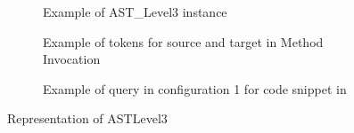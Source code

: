 \begin{figure}[t]
    \centering
      \begin{subfigure}{0.33\textwidth}
        \caption{Example of AST\_Level3 instance}
        \label{fig:mapping_expression} 
      \end{subfigure}
      \hfill
      \begin{subfigure}[t]{0.3\textwidth}
        \caption{Example of tokens for source and target in Method Invocation}
        \label{fig:method_desc_example}
      \end{subfigure}
      \begin{subfigure}{0.35\textwidth}
        \caption{\label{fig:example_in} Example of query in configuration 1 for code snippet in \cite{id:IntrinsicAndroidExample}}
      \end{subfigure}
\caption{
\label{fig:CombineImageOfASTLevel3}%
Representation of ASTLevel3}
\end{figure}

